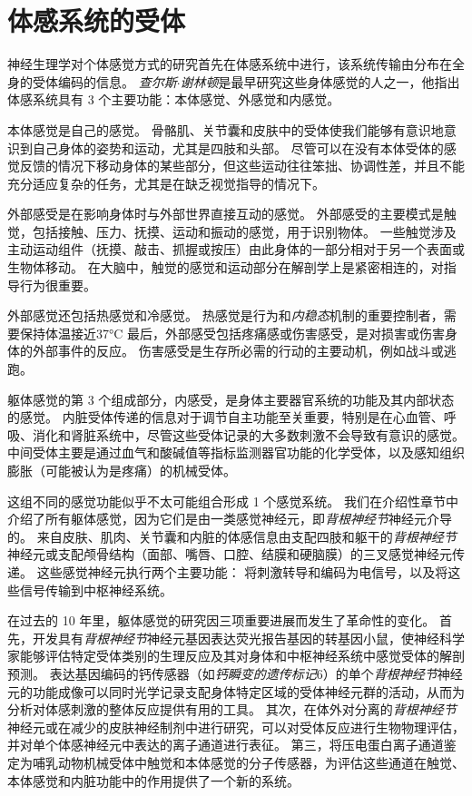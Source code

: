 \chapter{体感系统的受体} \label{chap:chap18}

神经生理学对个体感觉方式的研究首先在体感系统中进行，该系统传输由分布在全身的受体编码的信息。
\textit{查尔斯$\cdot$谢林顿}是最早研究这些身体感觉的人之一，他指出体感系统具有 3 个主要功能：本体感觉、外感觉和内感觉。


本体感觉是自己的感觉。
骨骼肌、关节囊和皮肤中的受体使我们能够有意识地意识到自己身体的姿势和运动，尤其是四肢和头部。
尽管可以在没有本体受体的感觉反馈的情况下移动身体的某些部分，但这些运动往往笨拙、协调性差，并且不能充分适应复杂的任务，尤其是在缺乏视觉指导的情况下。

外部感受是在影响身体时与外部世界直接互动的感觉。
外部感受的主要模式是触觉，包括接触、压力、抚摸、运动和振动的感觉，用于识别物体。
一些触觉涉及主动运动组件（抚摸、敲击、抓握或按压）由此身体的一部分相对于另一个表面或生物体移动。
在大脑中，触觉的感觉和运动部分在解剖学上是紧密相连的，对指导行为很重要。

外部感觉还包括热感觉和冷感觉。
热感觉是行为和\textit{内稳态}机制的重要控制者，需要保持体温接近37°C
最后，外部感受包括疼痛感或伤害感受，是对损害或伤害身体的外部事件的反应。
伤害感受是生存所必需的行动的主要动机，例如战斗或逃跑。


躯体感觉的第 3 个组成部分，内感受，是身体主要器官系统的功能及其内部状态的感觉。
内脏受体传递的信息对于调节自主功能至关重要，特别是在心血管、呼吸、消化和肾脏系统中，尽管这些受体记录的大多数刺激不会导致有意识的感觉。
中间受体主要是通过血气和酸碱值等指标监测器官功能的化学受体，以及感知组织膨胀（可能被认为是疼痛）的机械受体。


这组不同的感觉功能似乎不太可能组合形成 1 个感觉系统。
我们在介绍性章节中介绍了所有躯体感觉，因为它们是由一类感觉神经元，即\textit{背根神经节}神经元介导的。
来自皮肤、肌肉、关节囊和内脏的体感信息由支配四肢和躯干的\textit{背根神经节}神经元或支配颅骨结构（面部、嘴唇、口腔、结膜和硬脑膜）的三叉感觉神经元传递。
这些感觉神经元执行两个主要功能：
将刺激转导和编码为电信号，以及将这些信号传输到中枢神经系统。


在过去的 10 年里，躯体感觉的研究因三项重要进展而发生了革命性的变化。 
首先，开发具有\textit{背根神经节}神经元基因表达荧光报告基因的转基因小鼠，使神经科学家能够评估特定受体类别的生理反应及其对身体和中枢神经系统中感觉受体的解剖预测。
表达基因编码的钙传感器（如\textit{钙瞬变的遗传标记}6）的单个\textit{背根神经节}神经元的功能成像可以同时光学记录支配身体特定区域的受体神经元群的活动，从而为分析对体感刺激的整体反应提供有用的工具。
其次，在体外对分离的\textit{背根神经节}神经元或在减少的皮肤神经制剂中进行研究，可以对受体反应进行生物物理评估，并对单个体感神经元中表达的离子通道进行表征。
第三，将压电蛋白离子通道鉴定为哺乳动物机械受体中触觉和本体感觉的分子传感器，为评估这些通道在触觉、本体感觉和内脏功能中的作用提供了一个新的系统。


